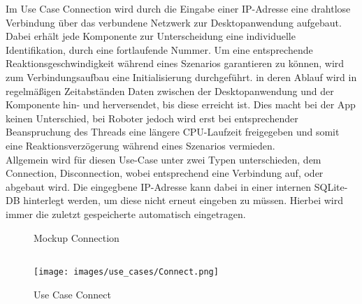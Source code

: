 Im Use Case Connection wird durch die Eingabe einer IP-Adresse eine drahtlose Verbindung über das verbundene Netzwerk zur Desktopanwendung aufgebaut. Dabei erhält jede Komponente zur Unterscheidung eine individuelle Identifikation, durch eine fortlaufende Nummer. Um eine entsprechende Reaktionsgeschwindigkeit während eines Szenarios garantieren zu können, wird zum Verbindungsaufbau eine Initialisierung durchgeführt. in deren Ablauf wird in regelmäßigen Zeitabständen Daten zwischen der Desktopanwendung und der Komponente hin- und herversendet, bis diese erreicht ist. Dies macht bei der App keinen Unterschied, bei Roboter jedoch wird erst bei entsprechender Beanspruchung des Threads eine längere CPU-Laufzeit freigegeben und somit eine Reaktionsverzögerung während eines Szenarios vermieden.\\
Allgemein wird für diesen Use-Case unter zwei Typen unterschieden, dem Connection, Disconnection, wobei entsprechend eine Verbindung auf, oder abgebaut wird. Die eingegbene IP-Adresse kann dabei in einer internen SQLite-DB hinterlegt werden, um diese nicht erneut eingeben zu müssen. Hierbei wird immer die zuletzt gespeicherte automatisch eingetragen.

\begin{figure}[h]
	\centering
	\qquad
	\caption{Mockup Connection}
\end{figure}
\newpage
\begin{verbatim}
\end{verbatim}
\begin{figure}[h]
	\begin{center}
		\texttt{[image: images/use\_cases/Connect.png]}
	\end{center}
	\caption{Use Case Connect}
	\label{fig:UC_Connect}
\end{figure}

